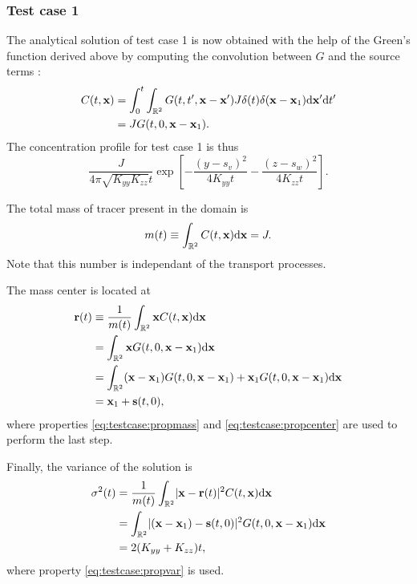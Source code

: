 \subsubsection{Test case 1}
The analytical solution of test case 1 is now obtained with the help of the Green's function derived above by computing the convolution between $G$ and the source terms :
\begin{align}
	C(t,\b x) &= \int_{0}^{t} \int_{\R[2]} G(t,t',\b x - \b x') J \delta(t) \delta(\b x- \b x_1) \rm d \b{x}' \rm dt'\nonumber\\
	&= J G(t,0,\b x - \b x_1).
\end{align}
The concentration profile for test case 1 is thus
\begin{equation}
	\frac{J}{4\pi\sqrt{K_{yy}K_{zz}}t}\exp\left[-\frac{(y-s_v)^2}{4K_{yy}t} -\frac{(z-s_w)^2}{4K_{zz}t} \right].
\end{equation}

The total mass of tracer present in the domain is
\begin{equation}
	m(t) \equiv \int_{\R[2]} C(t,\b x) \rm d \b x = J.
\end{equation}
Note that this number is independant of the transport processes.

The mass center is located at
\begin{align}
	\b r(t) &\equiv \frac{1}{m(t)} \int_{\R[2]} \b x C(t,\b x) \rm d \b x \nonumber \\
	&= \int_{\R[2]} \b x G(t,0,\b x - \b x_1) \rm d \b x \nonumber\\
	&= \int_{\R[2]} (\b x-\b x_1) G(t,0,\b x - \b x_1) + \b x_1 G(t,0,\b x - \b x_1) \rm d \b x\nonumber\\
	&= \b x_1 + \b s(t,0),
\end{align}
where properties \eqref{eq:testcase:propmass} and \eqref{eq:testcase:propcenter} are used to perform the last step.

Finally, the variance of the solution is
\begin{align}
	\sigma^2(t) &= \frac{1}{m(t)} \int_{\R[2]} \lvert \b x - \b r(t) \rvert^2 C(t,\b x) \rm d \b x \nonumber \\
	&= \int_{\R[2]} \lvert (\b x - \b x_1) - \b s(t,0)\rvert^2 G(t,0,\b x - \b x_1) \rm d \b x \nonumber \\
	&= 2(K_{yy}+K_{zz})t,
\end{align}
where property \eqref{eq:testcase:propvar} is used.


